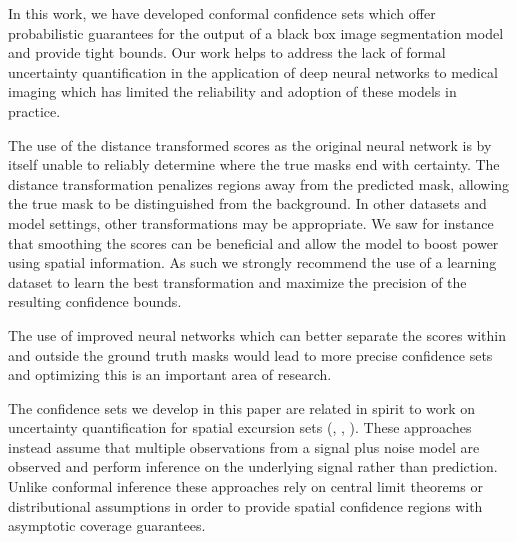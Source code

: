In this work, we have developed conformal confidence sets which offer probabilistic guarantees for the output of a black box image segmentation model and provide tight bounds. Our work helps to address the lack of formal uncertainty quantification in the application of deep neural networks to medical imaging which has limited the reliability and adoption of these models in practice. 

The use of the distance transformed scores  as the original neural network is by itself unable to reliably determine where the true masks end with certainty. The distance transformation penalizes regions away from the predicted mask, allowing the true mask to be distinguished from the background. In other datasets and model settings, other transformations may be appropriate. We saw for instance that smoothing the scores can be beneficial and allow the model to boost power using spatial information. As such we strongly recommend the use of a learning dataset to learn the best transformation and maximize the precision of the resulting confidence bounds.

The use of improved neural networks which can better separate the scores within and outside the ground truth masks would lead to more precise confidence sets and optimizing this is an important area of research. 

The confidence sets we develop in this paper are related in spirit to work on uncertainty quantification for spatial excursion sets (\cite{chen2017density}, \cite{Bowring2019}, \cite{Mejia2020}). These approaches instead assume that multiple observations from a signal plus noise model are observed and perform inference on the underlying signal rather than prediction. Unlike conformal inference these approaches rely on central limit theorems or distributional assumptions in order to provide spatial confidence regions with asymptotic coverage guarantees. 

